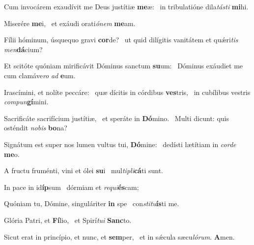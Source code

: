 \item Cum invocárem exaudívit me Deus justítiæ \textbf{me}æ:~\psstar{} in tribulatióne dila\textit{tásti} \textbf{mi}hi.
\item Miserére \textbf{me}i,~\psstar{} et exáudi orati\textit{ónem} \textbf{me}am.
\item Fílii hóminum, úsquequo gravi \textbf{cor}de?~\psstar{} ut quid dilígitis vanitátem et quǽri\textit{tis} \textit{men}\textbf{dá}cium?
\item Et scitóte quóniam mirificávit Dóminus sanctum \textbf{su}um:~\psstar{} Dóminus exáudiet me cum clamáve\textit{ro} \textit{ad} \textbf{e}um.
\item Irascímini, et nolíte peccáre:~\pscross{} quæ dícitis in córdibus \textbf{ves}tris,~\psstar{} in cubílibus vestris \textit{compun}\textbf{gí}mini.
\item Sacrificáte sacrifícium justítiæ,~\pscross{} et speráte in \textbf{Dó}mino.~\psstar{} Multi dicunt: quis osténdit \textit{nobis} \textbf{bo}na?
\item Signátum est super nos lumen vultus tui, \textbf{Dó}mine:~\psstar{} dedísti lætítiam in \textit{corde} \textbf{me}o.
\item A fructu fruménti, vini et ólei \textbf{su}i~\psstar{} mul\textit{tipli}\textbf{cá}ti sunt.
\item In pace in id\textbf{íp}sum~\psstar{} dórmiam et \textit{requi}\textbf{és}cam;
\item Quóniam tu, Dómine, singuláriter \textbf{in} spe~\psstar{} con\textit{stitu}\textbf{ís}ti me.
\item Glória Patri, et \textbf{Fí}lio,~\psstar{} et Spirí\textit{tui} \textbf{Sanc}to.
\item Sicut erat in princípio, et nunc, et \textbf{sem}per,~\psstar{} et in sǽcula sæcu\textit{lórum}. \textbf{A}men.
